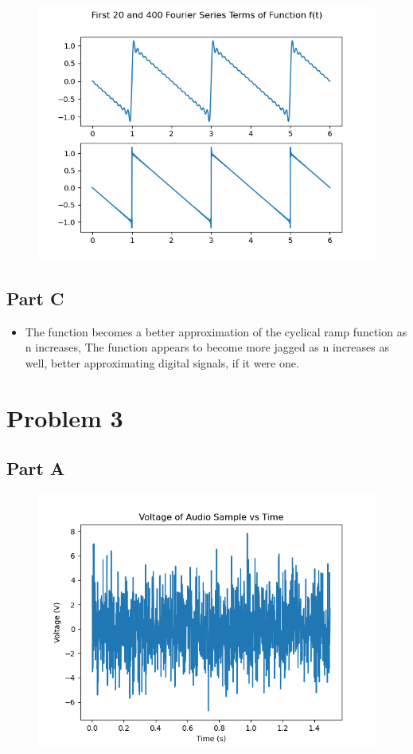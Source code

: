 \documentclass[]{report}
\begin{document}
\begin{figure}[H]
	\centering
	\includegraphics[width=0.7\linewidth]{../results/p2_20_400}
\end{figure}


\subsection{Part C}


\begin{itemize}
	\item The function becomes a better approximation of the cyclical ramp function  as n increases,  The function appears to become more jagged as n increases as well, better approximating digital signals, if it were one. 
\end{itemize}


\section{Problem 3}

\subsection{Part A}

\begin{figure}[H]
	\centering
	\includegraphics[width=0.7\linewidth]{../results/p3_t}
\end{figure}
\end{document}
